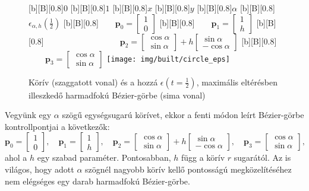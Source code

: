 \documentclass[12pt]{report}
\theoremstyle{definition}
\begin{document}
  \begin{figure}
  [b][B][0.8]{\bf{$0$}}
  [b][B][0.8]{\bf{$1$}}
  [b][B][0.8]{\bf{$x$}}
  [b][B][0.8]{\bf{$y$}}
  [b][B][0.8]{\bf{$\alpha$}}
  [b][B][0.8]{\bf{$\epsilon_{\alpha,h}(\frac{1}{2})$}\qquad}
  [b][B][0.8]{\bf{$\qquad\boldsymbol{p}_0=\begin{bmatrix} 1 \\ 0 \end{bmatrix}$}}
  [b][B][0.8]{\bf{$\qquad\boldsymbol{p}_1=\begin{bmatrix} 1 \\ h \end{bmatrix}$}}
  [b][B][0.8]{\bf{$\hspace{3cm}\qquad\boldsymbol{p}_2=\begin{bmatrix}\cos\alpha\\ \sin\alpha
                              \end{bmatrix} + h \begin{bmatrix} \sin\alpha \\
                              -\cos\alpha \end{bmatrix}$}}
  [b][B][0.8]{\bf{$\qquad\boldsymbol{p}_3=\begin{bmatrix}\cos\alpha\\ \sin\alpha
                              \end{bmatrix}$}}
    \centering
    \texttt{[image: img/built/circle\_eps]}
    \caption{\label{fig:circle} Körív (szaggatott vonal) és a hozzá
    $\epsilon(t=\frac{1}{2})$, maximális eltérésben illeszkedő harmadfokú
    Bézier-görbe (sima vonal)}
  \end{figure}

Vegyünk egy $\alpha$ szögű egységsugarú körívet, ekkor a fenti módon leírt
Bézier-görbe kontrollpontjai a következők:
\[\boldsymbol{p}_0 = \begin{bmatrix} 1 \\ 0 \end{bmatrix},\quad
  \boldsymbol{p}_1 = \begin{bmatrix} 1 \\ h \end{bmatrix},\quad
  \boldsymbol{p}_2 = \begin{bmatrix} \cos\alpha \\ \sin\alpha \end{bmatrix} + h
        \begin{bmatrix} \sin\alpha \\ -\cos\alpha \end{bmatrix},\quad
  \boldsymbol{p}_3 = \begin{bmatrix} \cos\alpha \\ \sin\alpha \end{bmatrix}, \]
ahol a $h$ egy szabad paraméter. Pontosabban, $h$ függ a körív $r$ sugarától.
Az is világos, hogy adott $\alpha$ szögnél nagyobb körív kellő pontosságú
megközelítéséhez nem elégséges egy darab harmadfokú Bézier-görbe.
\end{document}
